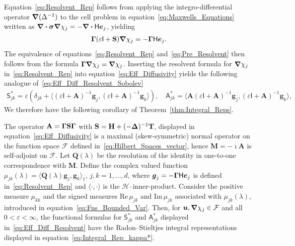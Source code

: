 \documentclass[leqno,onefignum,onetabnum]{siamltex1213}
\newcommand{\thmref}[1]{Theorem~\ref{#1}}
\newcommand\Real{\mbox{Re}\,} %
\newcommand\Imag{\mbox{Im}\,} %
\newcommand{\Mb}{\mathbf{M}}
\newcommand{\Tb}{\mathbf{T}}
\newcommand{\Hb}{\mathbf{H}}
\newcommand{\Sb}{\mathbf{S}}
\newcommand{\Ab}{\mathbf{A}}
\newcommand{\Qb}{\mathbf{Q}}
\newcommand{\Hc}{\mathcal{H}}
\newcommand{\Fc}{\mathcal{F}}
\newcommand{\Hm}{\mathsf{H}}
\newcommand{\Sm}{\mathsf{S}}
\newcommand{\Am}{\mathsf{A}}
\newcommand{\Ib}{\mathsf{I}}
\newcommand\bsig{\mbox{\boldmath${\sigma}$}}
\newcommand\bDelta{\mbox{\boldmath${\Delta}$}}
\newcommand\bGamma{\mbox{\boldmath${\Gamma}$}}
\newcommand\bnabla{\mbox{\boldmath${\nabla}$}}
\providecommand\bcdot{\boldsymbol{\cdot}}
\newcommand{\vecg}{\boldsymbol{g}}
\newcommand{\vecu}{\boldsymbol{u}}
\newcommand{\vece}{\boldsymbol{e}}
\begin{document}
%
Equation~\eqref{eq:Resolvent_Rep} follows from
applying the integro-differential operator $\bnabla (\Delta^{-1})$ to the
cell problem in equation~\eqref{eq:Maxwells_Equations} written as 
$\bnabla\bcdot\bsig\bnabla\chi_j=-\bnabla\bcdot\Hm\vece_j$, yielding  
%
\begin{align}\label{eq:Pre_Resolvent}
  \bGamma(\varepsilon\Ib+\Sb)\bnabla \chi_j=-\bGamma\Hm\vece_j.
\end{align}
%
The equivalence of equations~\eqref{eq:Resolvent_Rep}
and~\eqref{eq:Pre_Resolvent} then follows from the formula
$\bGamma\bnabla\chi_j=\bnabla\chi_j$. Inserting the resolvent formula for
$\bnabla\chi_j$ in~\eqref{eq:Resolvent_Rep} into
equation~\eqref{eq:Eff_Diffusivity} yields the following analogue
of~\eqref{eq:Eff_Diff_Resolvent_Sobolev} 
%
\begin{align}\label{eq:Eff_Diff_Resolvent}
 \Sm^*_{jk}=\varepsilon\left(\delta_{jk}+\langle(\varepsilon\Ib+\Ab)^{-1}\vecg_j,(\varepsilon\Ib+\Ab)^{-1}\vecg_k\rangle\right), \quad
 \Am^*_{jk}=\langle\Ab(\varepsilon\Ib+\Ab)^{-1}\vecg_j,(\varepsilon\Ib+\Ab)^{-1}\vecg_k\rangle,
\end{align}
%
We therefore have the following corollary of \thmref{thm:Integral_Reps}.
%
\begin{corollary}\label{cor:Integral_Reps}
  The operator $\Ab=\bGamma\Sb\bGamma$ with
  $\Sb=\Hb+(-\bDelta)^{-1}\Tb$, displayed in
  equation~\eqref{eq:Eff_Diffusivity} is a maximal (skew-symmetric)
  normal operator on the function space $\Fc$ defined
  in~\eqref{eq:Hilbert_Spaces_vector}, hence $\Mb=-\imath\Ab$ is
  self-adjoint on $\Fc$. Let $\Qb(\lambda)$ be the resolution of the
  identity in one-to-one correspondence with $\Mb$. Define the complex
  valued function $\mu_{jk}(\lambda)=\langle\Qb(\lambda)\vecg_j,\vecg_k\rangle_1$, $j,k=1,\ldots,d$,
  where $ \vecg_j=-\bGamma\Hm\vece_j$ is defined
  in~\eqref{eq:Resolvent_Rep} and $\langle\cdot,\cdot\rangle$ is the
  $\Hc$--inner-product. Consider the positive measure $\mu_{kk}$ and the
  signed measures $\Real\mu_{jk}$ and $\Imag\mu_{jk}$ associated with
  $\mu_{jk}(\lambda)$, introduced in
  equation~\eqref{eq:Fns_Bounded_Var}. Then, for
  $\vecu,\bnabla\chi_j\in\Fc$ and all $0<\varepsilon<\infty$, the functional formulas for
  $\Sm^*_{jk}$ and $\Am^*_{jk}$ displayed
  in~\eqref{eq:Eff_Diff_Resolvent} have the Radon--Stieltjes integral
  representations displayed in
  equation~\eqref{eq:Integral_Rep_kappa*}.     
% 
\end{corollary}
%
\end{document}
